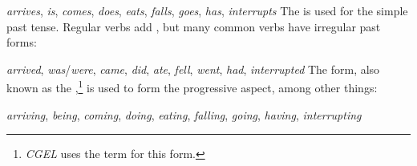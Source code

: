 \ea \emph{arrives}, \emph{is}, \emph{comes}, \emph{does}, \emph{eats}, \emph{falls}, \emph{goes}, \emph{has}, \emph{interrupts}\label{ex:3sing-pres}
\z
The  is used for the simple past tense. Regular verbs add , but many common verbs have irregular past forms:

\ea \emph{arrived}, \emph{was}/\emph{were}, \emph{came}, \emph{did}, \emph{ate}, \emph{fell}, \emph{went}, \emph{had}, \emph{interrupted}\label{ex:past-tense-forms}
\z
The  form, also known as the \label{sec:participles},\footnote{\textit{CGEL} uses the term  for this form.} is used to form the progressive aspect, among other things:

\ea \emph{arriving}, \emph{being}, \emph{coming}, \emph{doing}, \emph{eating}, \emph{falling}, \emph{going}, \emph{having}, \emph{interrupting}\label{ex:-ing}
\z

